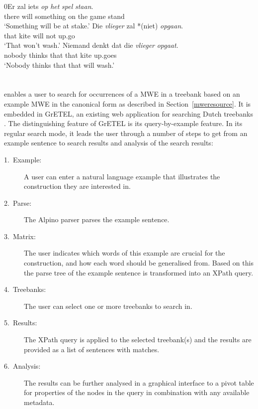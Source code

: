 \documentclass[output=paper,colorlinks,citecolor=brown]{langscibook}
\begin{document}
\begin{exe}
\ex 
\begin{xlist}
\ex \gll 0Er zal iets \textit{op} \textit{het} \textit{spel} \textit{staan}.\\
there will something on the game stand\\
\glt `Something will be at stake.' \label{0er}
\ex \gll Die \textit{vlieger} zal *(niet) \textit{opgaan}.\\
that kite will not up.go\\
\glt `That won't wash.'  \label{vliegerniet}
\ex \gll Niemand denkt dat die \textit{vlieger} \textit{opgaat}.\\
nobody thinks that that kite up.goes\\
\glt `Nobody thinks that that will wash.' \label{vliegernoniet}
\end{xlist}
\end{exe}

\section{{\mwefinder}}
\label{application}

{\mwefinder} enables a user to search for occurrences of a MWE in a treebank based on an example MWE in the canonical form as described in Section~\ref{mweresource}.
It is embedded in GrETEL, an existing web application for searching Dutch treebanks \citep{AUGUSTINUS12.756, Augustinusetal:GrETEL:2017, Odijk:etal:TLT16}.
The distinguishing feature of GrETEL is its query-by-example feature. In its regular search mode, it leads the user through a number of steps to get from an example sentence to search results and analysis of the search results:\largerpage

\begin{description}
\item[{1.\ Example:}] A user can enter a natural language example that illustrates the construction they are interested in.
\item[{2.\ Parse:}] The Alpino parser \citep{alpino-paper-2,Alpino:2002} parses the example sentence.
\item[{3.\ Matrix:}] The user indicates  which words of this example are crucial for the construction, and how each word should be generalised from. Based on this the parse tree of the example sentence is transformed into an XPath query.
\item[{4.\ Treebanks:}] The user can select one or more treebanks to search in.
\item[{5.\ Results:}] The XPath query is applied to the selected treebank(s) and the results are provided as a list of sentences with matches.
\item[{6.\ Analysis:}] The results can be further analysed in a graphical interface to a pivot table for properties of the nodes in the query in combination with any available metadata.
\end{description}
\end{document}
